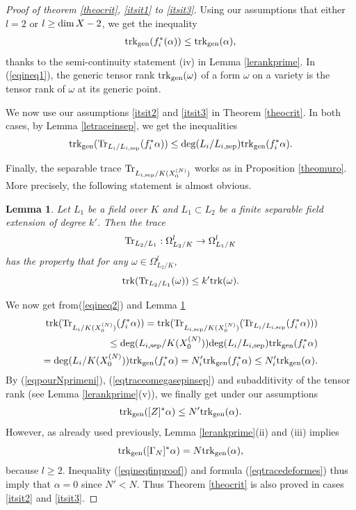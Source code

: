 \documentclass[10pt]{article}
\newtheorem{lemm}[theo]{Lemma}
\begin{document}
\begin{proof}[Proof of theorem \ref{theocrit}, \ref{itsit1} to \ref{itsit3}]
Using our assumptions that either $l=2$ or $l\geq {\rm dim}\,X-2$, we get the inequality
\begin{eqnarray}\label{eqineq1} {\rm trk}_{\rm gen} (f_i^*(\alpha))\leq  {\rm trk}_{\rm gen}(\alpha),
\end{eqnarray} thanks to the semi-continuity statement (iv) in Lemma \ref{lerankprime}. In (\ref{eqineq1}), the generic tensor rank ${\rm trk}_{\rm gen}(\omega)$ of a form $\omega$ on a variety  is the tensor rank of $\omega $ at its generic point.

We now use our assumptions \ref{itsit2} and \ref{itsit3} in Theorem \ref{theocrit}. In both cases, by Lemma \ref{letraceinsep}, we get the inequalities
\begin{eqnarray}\label{eqineq2} {\rm trk}_{\rm gen} ({\rm Tr}_{L_i/L_{i,{\rm sep}}} (f_i^*\alpha))\leq{\rm deg}(L_i/L_{i,{\rm sep}}){\rm trk}_{\rm gen} ( f_i^*\alpha).
\end{eqnarray}

Finally, the separable trace ${\rm Tr}_{L_{i,{\rm sep}}/K(X^{(N)}_0)}$ works as in Proposition \ref{theomuro}. More precisely,  the following statement is almost  obvious.
\begin{lemm} \label{lepourranksepar} Let $L_1$ be a field over $K$ and $L_1\subset L_2$ be a finite separable field extension of degree $k'$. Then the trace
$${\rm Tr}_{L_2/L_1}: \Omega_{L_2/K}^l\rightarrow \Omega_{L_1/K}^l$$
has the property that for any $\omega\in \Omega_{L_2/K}^l$,
$$ {\rm trk}({\rm Tr}_{L_2/L_1}(\omega))\leq  k' {\rm trk}(\omega).$$
\end{lemm}
We now get from(\ref{eqineq2}) and Lemma \ref{lepourranksepar}
\begin{eqnarray}\label{eqineq3}{\rm trk} ({\rm Tr}_{L_{i}/K(X^{(N)}_0)}( f_i^*\alpha))= {\rm trk} ({\rm Tr}_{L_{i,{\rm sep}}/K(X^{(N)}_0)}({\rm Tr}_{L_i/L_{i,{\rm sep}}} (f_i^*\alpha)))
\\
\nonumber
\leq {\rm deg}(L_{i,{\rm sep}}/K(X^{(N)}_0)){\rm deg}(L_i/L_{i,{\rm sep}}){\rm trk}_{\rm gen} ( f_i^*\alpha)\\
\nonumber ={\rm deg}(L_i/K(X^{(N)}_0)){\rm trk}_{\rm gen} ( f_i^*\alpha)=N'_i{\rm trk}_{\rm gen} ( f_i^*\alpha)\leq N'_i{\rm trk}_{\rm gen} (\alpha).
\end{eqnarray}
By  (\ref{eqpourNprimeni}), (\ref{eqtraceomegasepinsep}) and subadditivity of the tensor rank (see Lemma \ref{lerankprime}(v)), we finally get under our assumptions
\begin{eqnarray}\label{eqineqfinproof} {\rm trk}_{\rm gen}( [Z]^*\alpha)\leq N' {\rm trk}_{\rm gen}(\alpha).
\end{eqnarray}
However, as already used previously, Lemma \ref{lerankprime}(ii) and (iii) implies
$$ {\rm trk}_{\rm gen}([\Gamma_N]^*\alpha)=
N{\rm trk}_{\rm gen}(\alpha),$$ because $l\geq 2$.
Inequality (\ref{eqineqfinproof}) and formula (\ref{eqtracedeformes}) thus imply that $\alpha=0$ since $N'<N$. Thus Theorem \ref{theocrit} is also  proved  in cases \ref{itsit2} and \ref{itsit3}.
\end{proof}
\end{document}
